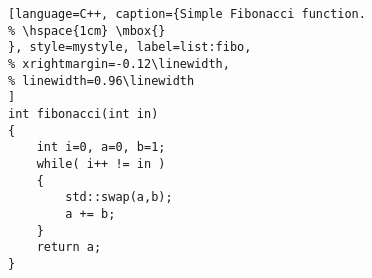 \begin{figure}
\begin{minipage}{\linewidth}
\begin{lstlisting}[language=C++, caption={Simple Fibonacci function.
% \hspace{1cm} \mbox{}
}, style=mystyle, label=list:fibo, 
% xrightmargin=-0.12\linewidth,
% linewidth=0.96\linewidth
]
int fibonacci(int in)
{
    int i=0, a=0, b=1;
    while( i++ != in )
    {
        std::swap(a,b);
        a += b;
    }
    return a;
}
\end{lstlisting}
\end{minipage}
\vspace{-0.1in}
\end{figure}
